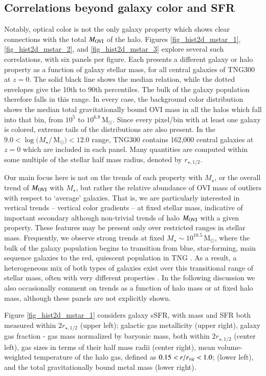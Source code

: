 \documentclass[useAMS,usenatbib]{mnras}
\newcommand{\msun}{\,M$_{\odot}$\xspace}
\newcommand{\ovi}{OVI\xspace}
\begin{document}
\subsection{Correlations beyond galaxy color and SFR}

Notably, optical color is not the only galaxy property which shows clear connections with the total $M_{\rm OVI}$ of the halo. Figures \ref{fig_hist2d_mstar_1}, \ref{fig_hist2d_mstar_2}, and \ref{fig_hist2d_mstar_3} explore several such correlations, with six panels per figure. Each presents a different galaxy or halo property as a function of galaxy stellar mass, for all central galaxies of TNG300 at $z=0$. The solid black line shows the median relation, while the dotted envelopes give the 10th to 90th percentiles. The bulk of the galaxy population therefore falls in this range. In every case, the background color distribution shows the median total gravitationally bound \ovi mass in all the halos which fall into that bin, from $10^5$ to $10^{6.8}$\msun. Since every pixel/bin with at least one galaxy is colored, extreme tails of the distributions are also present. In the \mbox{$9.0 < \log(M_\star / $\msun$) < 12.0$} range, TNG300 contains 162,000 central galaxies at $z=0$ which are included in each panel. Many quantities are computed within some multiple of the stellar half mass radius, denoted by $r_{\star,1/2}$.

Our main focus here is not on the trends of each property with $M_\star$, or the overall trend of $M_{\rm OVI}$ with $M_\star$, but rather the relative abundance of \ovi mass of outliers with respect to `average' galaxies. That is, we are particularly interested in vertical trends -- vertical color gradients -- at fixed stellar mass, indicative of important secondary although non-trivial trends of halo $M_{\rm OVI}$ with a given property. These features may be present only over restricted ranges in stellar mass. Frequently, we observe strong trends at fixed $M_\star \sim 10^{10.5}$\msun, where the bulk of the galaxy population begins to transition from blue, star-forming, main sequence galaxies to the red, quiescent population in TNG \citep{nelson18}. As a result, a heterogeneous mix of both types of galaxies exist over this transitional range of stellar mass, often with very different properties \citep[e.g. sizes;][]{genel18}. In the following discussion we also occasionally comment on trends as a function of halo mass or at fixed halo mass, although these panels are not explicitly shown.

Figure \ref{fig_hist2d_mstar_1} considers galaxy sSFR, with mass and SFR both measured within $2r_{\star,1/2}$ (upper left); galactic gas metallicity (upper right), galaxy gas fraction - gas mass normalized by baryonic mass, both within $2r_{\star,1/2}$ (center left), gas sizes in terms of their half mass radii (center right), mean volume-weighted temperature of the halo gas, defined as $0.15 < r/r_{\rm vir} < 1.0$; (lower left), and the total gravitationally bound metal mass  (lower right). 
\end{document}
